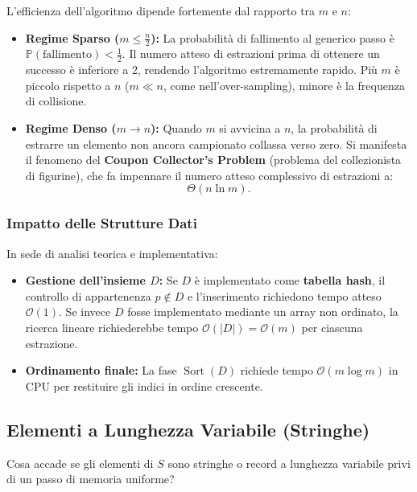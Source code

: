 \begin{property}
L'efficienza dell'algoritmo dipende fortemente dal rapporto tra $m$ e $n$:
\begin{itemize}
  \item \textbf{Regime Sparso ($m \le \frac{n}{2}$):} La probabilità di fallimento al generico passo è $\mathbb{P}(\text{fallimento}) < \frac{1}{2}$. Il numero atteso di estrazioni prima di ottenere un successo è inferiore a 2, rendendo l'algoritmo estremamente rapido. Più $m$ è piccolo rispetto a $n$ ($m \ll n$, come nell'over-sampling), minore è la frequenza di collisione.
  \item \textbf{Regime Denso ($m \to n$):} Quando $m$ si avvicina a $n$, la probabilità di estrarre un elemento non ancora campionato collassa verso zero. Si manifesta il fenomeno del \textbf{Coupon Collector's Problem} (problema del collezionista di figurine), che fa impennare il numero atteso complessivo di estrazioni a:
  \begin{equation}
    \Theta(n \ln m).
  \end{equation}
\end{itemize}
\end{property}

\subsubsection{Impatto delle Strutture Dati}
In sede di analisi teorica e implementativa:
\begin{itemize}
  \item \textbf{Gestione dell'insieme $D$:} Se $D$ è implementato come \textbf{tabella hash}, il controllo di appartenenza $p \notin D$ e l'inserimento richiedono tempo atteso $\mathcal{O}(1)$. Se invece $D$ fosse implementato mediante un array non ordinato, la ricerca lineare richiederebbe tempo $\mathcal{O}(|D|) = \mathcal{O}(m)$ per ciascuna estrazione.
  \item \textbf{Ordinamento finale:} La fase $\operatorname{Sort}(D)$ richiede tempo $\mathcal{O}(m \log m)$ in CPU per restituire gli indici in ordine crescente.
\end{itemize}

\FloatBarrier
\subsection{Elementi a Lunghezza Variabile (Stringhe)}
Cosa accade se gli elementi di $S$ sono stringhe o record a lunghezza variabile privi di un passo di memoria uniforme?

